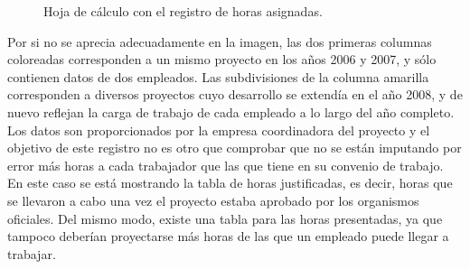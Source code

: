 \begin{figure}
\centering
{}
\caption{Hoja de cálculo con el registro de horas asignadas.}
\label{fig:hoja_calculo}
\end{figure}

Por si no se aprecia adecuadamente en la imagen, las dos primeras columnas
coloreadas corresponden a un mismo proyecto en los años 2006 y 2007, y sólo
contienen datos de dos empleados. Las subdivisiones de la columna amarilla
corresponden a diversos proyectos cuyo desarrollo se extendía en el año 2008, y
de nuevo reflejan la carga de trabajo de cada empleado a lo largo del año
completo. Los datos son proporcionados por la empresa coordinadora del proyecto
y el objetivo de este registro no es otro que comprobar que no se están
imputando por error más horas a cada trabajador que las que tiene en su convenio
de trabajo. En este caso se está mostrando la tabla de horas justificadas, es
decir, horas que se llevaron a cabo una vez el proyecto estaba aprobado por los
organismos oficiales. Del mismo modo, existe una tabla para las horas
presentadas, ya que tampoco deberían proyectarse más horas de las que un
empleado puede llegar a trabajar.

